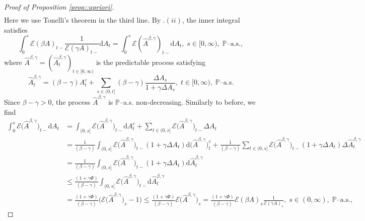 \documentclass[10pt]{article} %
\newcommand\cE{\mathcal E}
\def \P{\mathbb{P}}
\def\d{\mathrm{d}}
\begin{document}
\begin{proof}[Proof of Proposition \ref{prop::apriori}]
\begin{align}
\end{align}
Here we use Tonelli's theorem in the third line. By .$(ii)$, the inner integral satisfies
\begin{equation*}
	\int_0^s \cE(\beta A)_{t-}  \frac{1}{\cE(\gamma A)_{t-}} \d A_t  = \int_0^s \cE(\widehat A^{\beta,\gamma})_{t-} \d A_t,\; s \in [0,\infty), \; \text{$\P$--a.s.},
\end{equation*}
where $\widehat A^{\beta,\gamma} = (\widehat A^{\beta,\gamma}_t)_{t \in [0,\infty)}$ is the predictable process satisfying
\begin{equation}\label{eq::widehat_A_beta_gamma}
	\widehat A^{\beta,\gamma}_t = (\beta-\gamma)A^c_t + \sum_{s \in (0,t]} (\beta-\gamma)\frac{\Delta A_s}{1+\gamma\Delta A_s}, \; t \in [0,\infty), \; \text{$\P$--a.s.}
\end{equation}
Since $\beta-\gamma > 0$, the process $\widehat A^{\beta,\gamma}$ is $\P$--a.s. non-decreasing. Similarly to before, we find
\begin{align}\label{eq::widehat_A_integral}
	\int_0^s \cE\big(\widehat A^{\beta,\gamma}\big)_{t-} \d A_t &= \int_{(0,s]} \cE\big(\widehat A^{\beta,\gamma}\big)_{t-} \d A^c_t + \sum_{t \in (0,s]} \cE\big(\widehat A^{\beta,\gamma}\big)_{t-} \Delta A_t \nonumber\\
	&= \frac{1}{(\beta-\gamma)}\int_{(0,s]} \cE\big(\widehat A^{\beta,\gamma}\big)_{t-} (1+\gamma\Delta A_t) \d \big(\widehat A^{\beta,\gamma}\big)^c_t + \frac{1}{(\beta-\gamma)}\sum_{t \in (0,s]} \cE\big(\widehat A^{\beta,\gamma}\big)_{t-} (1+\gamma\Delta A_t) \Delta \widehat A^{\beta,\gamma}_t \nonumber\\
	&= \frac{1}{(\beta-\gamma)}\int_{(0,s]} \cE\big(\widehat A^{\beta,\gamma}\big)_{t-} (1+\gamma\Delta A_t) \d \widehat A^{\beta,\gamma}_t \nonumber\\
	&\leq \frac{(1+\gamma\Phi)}{(\beta - \gamma)} \int_{(0,s]} \cE\big(\widehat A^{\beta,\gamma}\big)_{t-} \d \widehat A^{\beta,\gamma}_t \nonumber\\
	&= \frac{(1+\gamma\Phi)}{(\beta - \gamma)} \big(\cE\big(\widehat A^{\beta,\gamma}\big)_s - 1\big) \leq \frac{(1+\gamma\Phi)}{(\beta - \gamma)} \cE\big(\widehat A^{\beta,\gamma}\big)_s = \frac{(1+\gamma\Phi)}{(\beta - \gamma)} \cE(\beta A)_s \frac{1}{\cE(\gamma A)_s},\; s \in (0,\infty), \; \text{$\P$--a.s.},

\end{align}
\end{proof}
\end{document}
